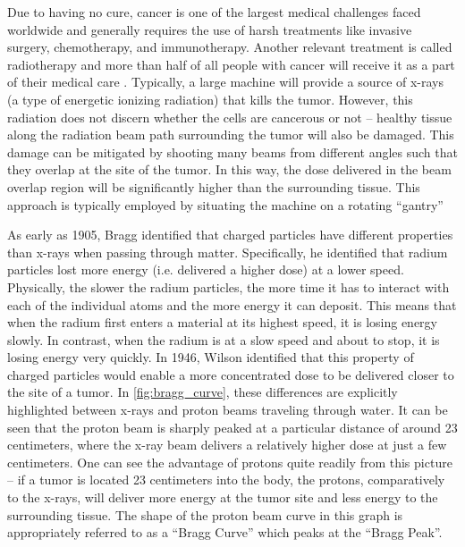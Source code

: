 Due to having no cure, cancer is one of the largest medical challenges faced worldwide and generally requires the use of harsh treatments like invasive surgery, chemotherapy, and immunotherapy. Another relevant treatment is called radiotherapy and more than half of all people with cancer will receive it as a part of their medical care \cite{Mayo_2024_Cancer}. Typically, a large machine will provide a source of x-rays (a type of energetic ionizing radiation) that kills the tumor. However, this radiation does not discern whether the cells are cancerous or not -- healthy tissue along the radiation beam path surrounding the tumor will also be damaged. This damage can be mitigated by shooting many beams from different angles such that they overlap at the site of the tumor. In this way, the dose delivered in the beam overlap region will be significantly higher than the surrounding tissue. This approach is typically employed by situating the machine on a rotating ``gantry''

As early as 1905, Bragg \cite{Bragg_1905_JOS} identified that charged particles have different properties than x-rays when passing through matter. Specifically, he identified that radium particles lost more energy (i.e. delivered a higher dose) at a lower speed. Physically, the slower the radium particles, the more time it has to interact with each of the individual atoms and the more energy it can deposit. This means that when the radium first enters a material at its highest speed, it is losing energy slowly. In contrast, when the radium is at a slow speed and about to stop, it is losing energy very quickly. In 1946, Wilson \cite{Wilson_1946_Rad} identified that this property of charged particles would enable a more concentrated dose to be delivered closer to the site of a tumor. In \autoref{fig:bragg_curve}, these differences are explicitly highlighted between x-rays and proton beams traveling through water. It can be seen that the proton beam is sharply peaked at a particular distance of around 23 centimeters, where the x-ray beam delivers a relatively higher dose at just a few centimeters. One can see the advantage of protons quite readily from this picture -- if a tumor is located 23 centimeters into the body, the protons, comparatively to the x-rays, will deliver more energy at the tumor site and less energy to the surrounding tissue. The shape of the proton beam curve in this graph is appropriately referred to as a ``Bragg Curve'' which peaks at the ``Bragg Peak''. 

